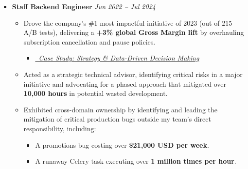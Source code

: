 \documentclass[a4paper,11pt]{article}
\begin{document}
\begin{itemize}[leftmargin=*, topsep=4pt, partopsep=0pt, itemsep=8pt, parsep=0pt] %
    \item \textbf{Staff Backend Engineer} \hfill \textit{Jun 2022 – Jul 2024}
        \begin{itemize}[leftmargin=1.5em, topsep=2pt, itemsep=4pt]
                \item Drove the company's \#1 most impactful initiative of 2023 (out of 215 A/B tests), delivering a \textbf{+3\% global Gross Margin lift} by overhauling subscription cancellation and pause policies.
                \begin{itemize}[leftmargin=1.5em, topsep=0pt, itemsep=0pt, partopsep=0pt, parsep=0pt]
                    \item[] \href{https://www.isaacbernat.com/cv#casestudy-postpone-billing}{\textit{\small \faArrowCircleRight\ Case Study: Strategy \& Data-Driven Decision Making}}
                    \end{itemize}
                \item Acted as a strategic technical advisor, identifying critical risks in a major initiative and advocating for a phased approach that mitigated over \textbf{10,000 hours} in potential wasted development.
                \item Exhibited cross-domain ownership by identifying and leading the mitigation of critical production bugs outside my team's direct responsibility, including:
                    \begin{itemize}[leftmargin=1em, topsep=2pt, itemsep=0pt]
                        \item[\textbullet] A promotions bug costing over \textbf{\$21,000 USD per week}.
                        \item[\textbullet] A runaway Celery task executing over \textbf{1 million times per hour}.
                    \end{itemize}
            \end{itemize}
        

\end{itemize}
\end{document}
